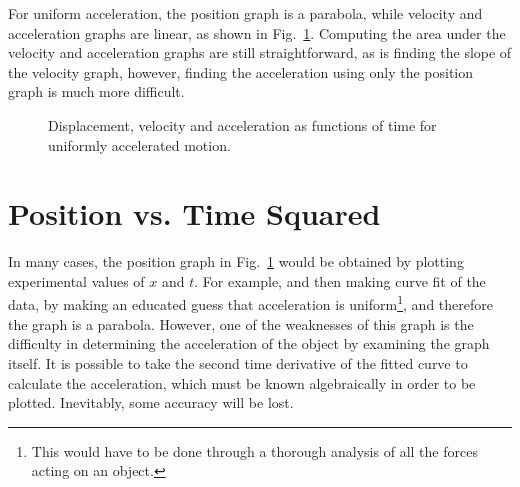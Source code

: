 \documentclass{../../../oss-handout}
\begin{document}
For uniform acceleration, the position graph is a parabola, while velocity and
acceleration graphs are linear, as shown in Fig.~\ref{uniform-acceleration}.
Computing the area under the velocity and acceleration graphs are still
straightforward, as is finding the slope of the velocity graph, however,
finding the acceleration using only the position graph is much more difficult.
\begin{figure}[!ht]
  \centering
  \hspace{.15in}
  \hspace{.15in}
  \caption{Displacement, velocity and acceleration as functions of time for
    uniformly accelerated motion.}
  \label{uniform-acceleration}
\end{figure}


\section{Position vs. Time Squared}
In many cases, the position graph in Fig.~\ref{uniform-acceleration} would be
obtained by plotting experimental values of $x$ and $t$. For example, and then
making curve fit of the data, by making an educated guess that acceleration is
uniform\footnote{This would have to be done through a thorough analysis of all
  the forces acting on an object.}, and therefore the graph is a parabola.
However, one of the weaknesses of this graph is the difficulty in determining
the acceleration of the object by examining the graph itself. It is possible to
take the second time derivative of the fitted curve to calculate the
acceleration, which must be known algebraically in order to be plotted.
Inevitably, some accuracy will be lost.
\end{document}
